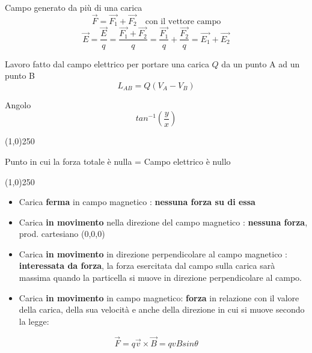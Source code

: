 \documentclass[14pt]{extarticle}
\begin{document}
Campo generato da più di una carica
\begin{equation*}
    \overrightarrow{F}=\overrightarrow{F_1}+\overrightarrow{F_2} \quad\text{con il vettore campo}
\end{equation*}
\begin{equation*}
    \overrightarrow{E}=\frac{\overrightarrow{E}}{q}=\frac{\overrightarrow{F_1}+\overrightarrow{F_2}}{q}=\frac{\overrightarrow{F_1}}{q}+\frac{\overrightarrow{F_2}}{q}=\overrightarrow{E_1}+\overrightarrow{E_2}
\end{equation*}

Lavoro fatto dal campo elettrico per portare una carica $Q$ da un punto A ad un punto B
\begin{equation*}
    L_{AB}=Q(V_A-V_B)
\end{equation*}

Angolo
\begin{equation*}
    tan^{-1}(\frac{y}{x})
\end{equation*}

\begin{center}
    \line(1,0){250}
\end{center}
Punto in cui la forza totale è nulla = Campo elettrico è nullo
\begin{center}
    \line(1,0){250}
\end{center}
\begin{itemize}
    \item Carica \textbf{ferma} in campo magnetico : \textbf{nessuna forza su di essa}
    \item Carica \textbf{in movimento} nella direzione del campo magnetico : \textbf{nessuna forza}, prod. cartesiano (0,0,0)
    \item Carica \textbf{in movimento} in direzione perpendicolare al campo magnetico : \textbf{interessata da forza}, la forza esercitata dal campo sulla carica sarà massima 
    quando la particella si muove in direzione perpendicolare al campo.
    \item Carica \textbf{in movimento} in campo magnetico: \textbf{forza} in relazione con il valore della carica, della sua velocità e anche della direzione in cui
    si muove secondo la legge:
\end{itemize}
\begin{equation*}
    \overrightarrow{F}=q\overrightarrow{v}\times\overrightarrow{B}=qvBsin\theta
\end{equation*}
\end{document}
